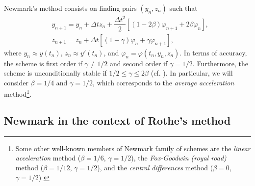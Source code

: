 \documentclass{sfuthesis}
\numberwithin{equation}{section}
\numberwithin{figure}{chapter}
\numberwithin{table}{chapter}
\theoremstyle{definition}
\begin{document}
Newmark's method consists on finding pairs $(y_n,z_n)$ such that
\begin{subequations} \label{eq:newmark}
    \begin{align}
        &y_{n+1} = y_n + \Delta t z_n + \dfrac{\Delta t^2}{2} \left[ (1-2\beta)\varphi_{n+1} + 2\beta \varphi_n \right], \\
        &z_{n+1} = z_n + \Delta t \left[(1-\gamma) \varphi_n + \gamma \varphi_{n+1} \right],
    \end{align}
\end{subequations}
where $y_n \approx y(t_n)$, $z_n \approx y'(t_n)$, and $\varphi_n = \varphi(t_n, y_n, z_n)$. In terms of accuracy, the scheme is first order if $\gamma \neq 1/2$ and second order if $\gamma = 1/2$. Furthermore, the scheme is unconditionally stable if $1/2 \leq \gamma \leq 2\beta$ (cf. \cite{HughesBook,raviartthomas}). In particular, we will consider $\beta=1/4$ and $\gamma=1/2$, which corresponds to the \textit{average acceleration} method\footnote{Some other well-known members of Newmark family of schemes are the \textit{linear acceleration} method ($\beta=1/6$, $\gamma=1/2$), the \textit{Fox-Goodwin (royal road)} method ($\beta=1/12$, $\gamma=1/2$), and the \textit{central differences} method ($\beta=0$, $\gamma=1/2$) \cite{HughesBook}}.

\subsection{Newmark in the context of Rothe's method} \label{sec:rothe_newmark}
\end{document}
